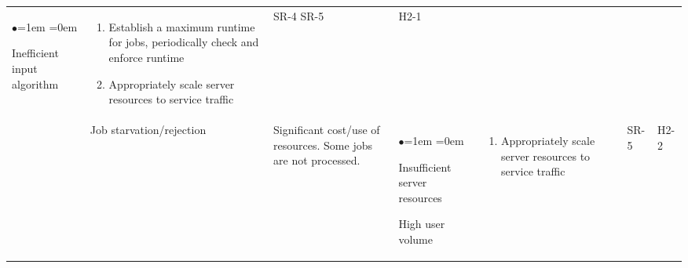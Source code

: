 \documentclass{article}
\begin{document}
\begin{table}[H]
\begin{tabularx}{\textwidth}{|P{2cm}|P{2cm}|P{2cm}|P{2cm}|P{3.45cm}|P{1cm}|P{1cm}|}
\begin{list}{$\bullet$}{\leftmargin=1em \itemindent=0em}
            \item Inefficient input algorithm
        \end{list}
        & 
        \begin{enumerate}[label=(\alph*)]{\leftmargin=1em \itemindent=0em}
            \item Establish a maximum runtime for jobs, periodically check and enforce runtime
            \item Appropriately scale server resources to service traffic
        \end{enumerate}
        & SR-4 SR-5 & H2-1\\
        & Job starvation/rejection & Significant cost/use of resources. Some jobs are not processed. & 
        \begin{list}{$\bullet$}{\leftmargin=1em \itemindent=0em}
            \item Insufficient server resources
            \item High user volume
        \end{list}
        & 
        \begin{enumerate}[label=(\alph*)]{\leftmargin=1em \itemindent=0em}
            \item Appropriately scale server resources to service traffic
        \end{enumerate}
        & SR-5 & H2-2\\
        \hline
    \end{tabularx}
\end{table}
\end{document}
